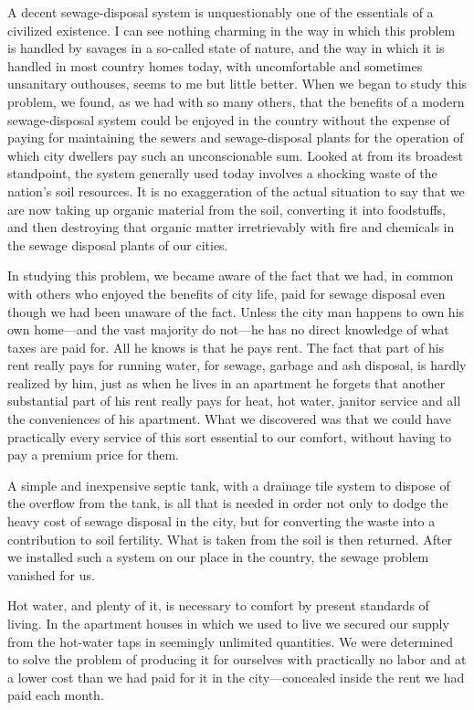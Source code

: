 \documentclass{book}
\begin{document}
A decent sewage-disposal system is unquestionably one of the essentials of a civilized existence. I can see nothing charming in the way in which this problem is handled by savages in a so-called state of nature, and the way in which it is handled in most country homes today, with uncomfortable and sometimes unsanitary outhouses, seems to me but little better. When we began to study this problem, we found, as we had with so many others, that the benefits of a modern sewage-disposal system could be enjoyed in the country without the expense of paying for maintaining the sewers and sewage-disposal plants for the operation of which city dwellers pay such an unconscionable sum. Looked at from its broadest standpoint, the system generally used today involves a shocking waste of the nation’s soil resources. It is no exaggeration of the actual situation to say that we are now taking up organic material from the soil, converting it into foodstuffs, and then destroying that organic matter irretrievably with fire and chemicals in the sewage disposal plants of our cities.

In studying this problem, we became aware of the fact that we had, in common with others who enjoyed the benefits of city life, paid for sewage disposal even though we had been unaware of the fact. Unless the city man happens to own his own home—and the vast majority do not—he has no direct knowledge of what taxes are paid for. All he knows is that he pays rent. The fact that part of his rent really pays for running water, for sewage, garbage and ash disposal, is hardly realized by him, just as when he lives in an apartment he forgets that another substantial part of his rent really pays for heat, hot water, janitor service and all the conveniences of his apartment. What we discovered was that we could have practically every service of this sort essential to our comfort, without having to pay a premium price for them.

A simple and inexpensive septic tank, with a drainage tile system to dispose of the overflow from the tank, is all that is needed in order not only to dodge the heavy cost of sewage disposal in the city, but for converting the waste into a contribution to soil fertility. What is taken from the soil is then returned. After we installed such a system on our place in the country, the sewage problem vanished for us.

Hot water, and plenty of it, is necessary to comfort by present standards of living. In the apartment houses in which we used to live we secured our supply from the hot-water taps in seemingly unlimited quantities. We were determined to solve the problem of producing it for ourselves with practically no labor and at a lower cost than we had paid for it in the city—concealed inside the rent we had paid each month.
\end{document}
